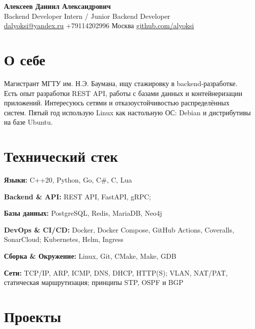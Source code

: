 \documentclass[10pt,a4paper]{article}
\begin{document}
\begin{center}
  {\LARGE\bfseries Алексеев Даниил Александрович}\\[0.15em]
  {\normalsize\color{accent} Backend Developer Intern / Junior Backend Developer}\\[0.3em]
  {\small
    \href{mailto:dalyoksi@yandex.ru}{dalyoksi@yandex.ru}
    \;\textbullet\; +79114202996 \;\textbullet\; Москва
    \;\textbullet\; \href{https://github.com/alyoksi}{github.com/alyoksi}
  }
\end{center}
\vspace{-0.3em}

\section*{О себе}
Магистрант МГТУ им. Н.Э. Баумана, ищу стажировку в backend-разработке. Есть опыт разработки REST API, работы с базами данных и контейнеризации приложений. Интересуюсь сетями и отказоустойчивостью распределённых систем. Пятый год использую Linux как настольную ОС: Debian и дистрибутивы на базе Ubuntu.

\section*{Технический стек}

\textbf{Языки:} C++20, Python, Go, C\#, C, Lua

\textbf{Backend \& API:} REST API, FastAPI, gRPC;

\textbf{Базы данных:} PostgreSQL, Redis, MariaDB, Neo4j

\textbf{DevOps \& CI/CD:} Docker, Docker Compose, GitHub Actions, Coveralls, SonarCloud; Kubernetes, Helm, Ingress

\textbf{Сборка \& Окружение:} Linux, Git, CMake, Make, GDB

\textbf{Сети:} TCP/IP, ARP, ICMP, DNS, DHCP, HTTP(S); VLAN, NAT/PAT, статическая маршрутизация; принципы STP, OSPF и BGP

\section*{Проекты}
\end{document}

